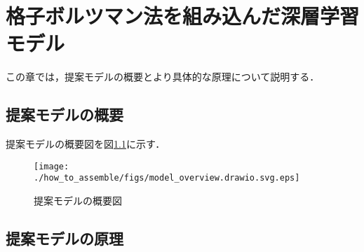 \chapter{格子ボルツマン法を組み込んだ深層学習モデル\label{chap:how-to-assemble}}
この章では，提案モデルの概要とより具体的な原理について説明する．

\section{提案モデルの概要}
提案モデルの概要図を図\ref{fig:overview}に示す．
\begin{figure}[htbp]
  \centering
  \texttt{[image: ./how\_to\_assemble/figs/model\_overview.drawio.svg.eps]}
  \caption{提案モデルの概要図}
  \label{fig:overview}
\end{figure}

\section{提案モデルの原理}
